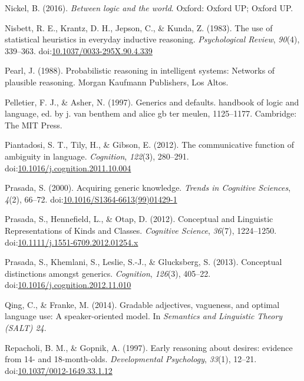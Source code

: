 \documentclass[english,floatsintext,man]{apa6}
\theoremstyle{definition}
\theoremstyle{definition}
\theoremstyle{definition}
\theoremstyle{remark}
\begin{document}
\hypertarget{ref-Nickel2016}{}
Nickel, B. (2016). \emph{Between logic and the world}. Oxford: Oxford
UP; Oxford UP.

\hypertarget{ref-Nisbett1983}{}
Nisbett, R. E., Krantz, D. H., Jepson, C., \& Kunda, Z. (1983). The use
of statistical heuristics in everyday inductive reasoning.
\emph{Psychological Review}, \emph{90}(4), 339--363.
doi:\href{https://doi.org/10.1037/0033-295X.90.4.339}{10.1037/0033-295X.90.4.339}

\hypertarget{ref-pearl1988probabilistic}{}
Pearl, J. (1988). Probabilistic reasoning in intelligent systems:
Networks of plausible reasoning. Morgan Kaufmann Publishers, Los Altos.

\hypertarget{ref-Pelletier1997}{}
Pelletier, F. J., \& Asher, N. (1997). Generics and defaults. handbook
of logic and language, ed. by j. van benthem and alice gb ter meulen,
1125--1177. Cambridge: The MIT Press.

\hypertarget{ref-Piantadosi2012}{}
Piantadosi, S. T., Tily, H., \& Gibson, E. (2012). The communicative
function of ambiguity in language. \emph{Cognition}, \emph{122}(3),
280--291.
doi:\href{https://doi.org/10.1016/j.cognition.2011.10.004}{10.1016/j.cognition.2011.10.004}

\hypertarget{ref-Prasada2000}{}
Prasada, S. (2000). Acquiring generic knowledge. \emph{Trends in
Cognitive Sciences}, \emph{4}(2), 66--72.
doi:\href{https://doi.org/10.1016/S1364-6613(99)01429-1}{10.1016/S1364-6613(99)01429-1}

\hypertarget{ref-Prasada2012}{}
Prasada, S., Hennefield, L., \& Otap, D. (2012). Conceptual and
Linguistic Representations of Kinds and Classes. \emph{Cognitive
Science}, \emph{36}(7), 1224--1250.
doi:\href{https://doi.org/10.1111/j.1551-6709.2012.01254.x}{10.1111/j.1551-6709.2012.01254.x}

\hypertarget{ref-Prasada2013}{}
Prasada, S., Khemlani, S., Leslie, S.-J., \& Glucksberg, S. (2013).
Conceptual distinctions amongst generics. \emph{Cognition},
\emph{126}(3), 405--22.
doi:\href{https://doi.org/10.1016/j.cognition.2012.11.010}{10.1016/j.cognition.2012.11.010}

\hypertarget{ref-Qing2014}{}
Qing, C., \& Franke, M. (2014). Gradable adjectives, vagueness, and
optimal language use: A speaker-oriented model. In \emph{Semantics and
Linguistic Theory (SALT) 24}.

\hypertarget{ref-Repacholi1997}{}
Repacholi, B. M., \& Gopnik, A. (1997). Early reasoning about desires:
evidence from 14- and 18-month-olds. \emph{Developmental Psychology},
\emph{33}(1), 12--21.
doi:\href{https://doi.org/10.1037/0012-1649.33.1.12}{10.1037/0012-1649.33.1.12}
\end{document}
